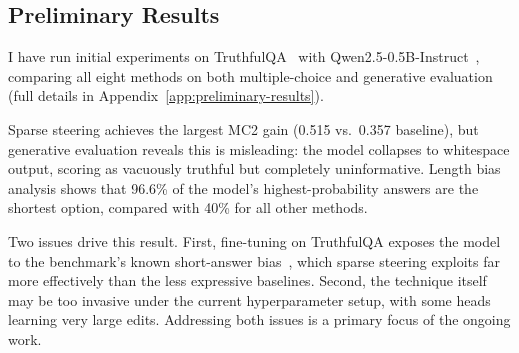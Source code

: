 \subsection{Preliminary Results}\label{sec:preliminary-results}

I have run initial experiments on TruthfulQA~\cite{lin2022truthfulqa} with Qwen2.5-0.5B-Instruct~\cite{qwen2025qwen25}, comparing all eight methods on both multiple-choice and generative evaluation (full details in Appendix~\ref{app:preliminary-results}).

Sparse steering achieves the largest MC2 gain (0.515 vs.\ 0.357 baseline), but generative evaluation reveals this is misleading: the model collapses to whitespace output, scoring as vacuously truthful but completely uninformative. Length bias analysis shows that 96.6\% of the model's highest-probability answers are the shortest option, compared with 40\% for all other methods.

Two issues drive this result. First, fine-tuning on TruthfulQA exposes the model to the benchmark's known short-answer bias~\cite{turntrout2025truthfulqa}, which sparse steering exploits far more effectively than the less expressive baselines. Second, the technique itself may be too invasive under the current hyperparameter setup, with some heads learning very large edits. Addressing both issues is a primary focus of the ongoing work.
